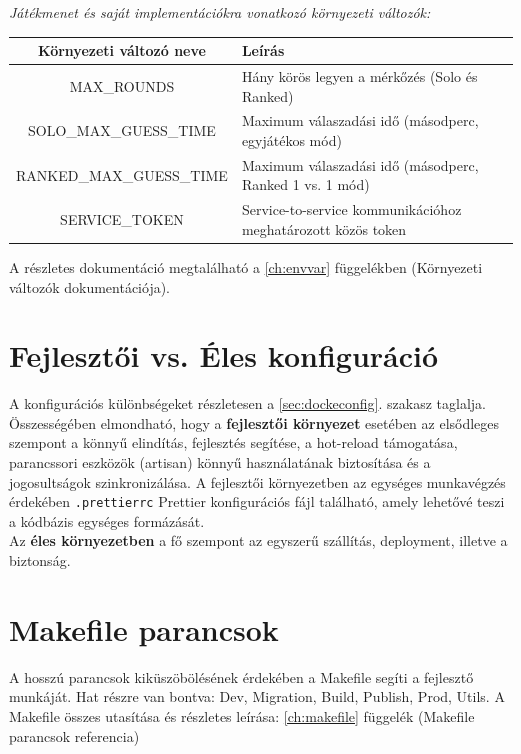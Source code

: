\begin{center}
    \textit{Játékmenet és saját implementációkra vonatkozó környezeti változók:}\\
    \begin{tabular}{|c|l|}
        \hline
        \textbf{Környezeti változó neve} & \textbf{Leírás} \\
        \hline
        MAX\_ROUNDS & Hány körös legyen a mérkőzés (Solo és Ranked) \\
        \hline
        SOLO\_MAX\_GUESS\_TIME & Maximum válaszadási idő (másodperc, egyjátékos mód) \\
        \hline
        RANKED\_MAX\_GUESS\_TIME & Maximum válaszadási idő (másodperc, Ranked 1 vs. 1 mód) \\
        \hline
        SERVICE\_TOKEN & Service-to-service kommunikációhoz meghatározott közös token \\
        \hline
    \end{tabular}
\end{center}

A részletes dokumentáció megtalálható a \ref{ch:envvar} függelékben (Környezeti változók dokumentációja).

\section{Fejlesztői vs. Éles konfiguráció}
A konfigurációs különbségeket részletesen a \ref{sec:dockeconfig}. szakasz taglalja. 
\\
Összességében elmondható, hogy a \textbf{fejlesztői környezet} esetében az elsődleges szempont a könnyű elindítás, fejlesztés segítése, a hot-reload támogatása, parancssori eszközök (artisan) könnyű használatának biztosítása és a jogosultságok szinkronizálása. A fejlesztői környezetben az egységes munkavégzés érdekében \texttt{.prettierrc} Prettier konfigurációs fájl található, amely lehetővé teszi a kódbázis egységes formázását.
\\
Az \textbf{éles környezetben} a fő szempont az egyszerű szállítás, deployment, illetve a biztonság. 

\section{Makefile parancsok}
A hosszú parancsok kiküszöbölésének érdekében a Makefile segíti a fejlesztő munkáját. Hat részre van bontva: Dev, Migration, Build, Publish, Prod, Utils.
A Makefile összes utasítása és részletes leírása: \ref{ch:makefile} függelék (Makefile parancsok referencia)